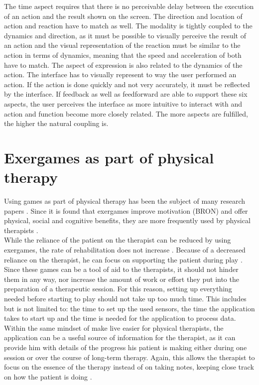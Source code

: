 The time aspect requires that there is no perceivable delay between the execution of an action and the result shown on the screen. The direction and location of action and reaction have to match as well. The modality is tightly coupled to the dynamics and direction, as it must be possible to visually perceive the result of an action and the visual representation of the reaction must be similar to the action in terms of dynamics, meaning that the speed and acceleration of both have to match. The aspect of expression is also related to the dynamics of the action. The interface has to visually represent to way the user performed an action. If the action is done quickly and not very accurately, it must be reflected by the interface. If feedback as well as feedforward are able to support these six aspects, the user perceives the interface as more intuitive to interact with and action and function become more closely related. The more aspects are fulfilled, the higher the natural coupling is.\cite{Wensveen2004}\\


\section{Exergames as part of physical therapy}

Using games as part of physical therapy has been the subject of many research papers \cite{Hondori2014}\cite{Lange2012}\cite{Chang2011}. Since it is found that exergames improve motivation (BRON) and offer physical, social and cognitive benefits, they are more frequently used by physical therapists \cite{Peng2011}\cite{Staiano2011}.\\

While the reliance of the patient on the therapist can be reduced by using exergames, the rate of rehabilitation does not increase \cite{Dahl2014}. Because of a decreased reliance on the therapist, he can focus on supporting the patient during play \cite{Annema2013}. Since these games can be a tool of aid to the therapists, it should not hinder them in any way, nor increase the amount of work or effort they put into the preparation of a therapeutic session. For this reason, setting up everything needed before starting to play should not take up too much time. This includes but is not limited to: the time to set up the used sensors, the time the application takes to start up and the time is needed for the application to process data.\\

Within the same mindset of make live easier for physical therapists, the application can be a useful source of information for the therapist, as it can provide him with details of the progress his patient is making either during one session or over the course of long-term therapy. Again, this allows the therapist to focus on the essence of the therapy instead of on taking notes, keeping close track on how the patient is doing \cite{Annema2013}.\\